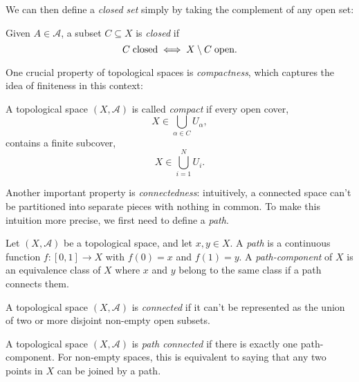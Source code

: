 We can then define a \emph{closed set} simply by taking the complement of any open set:

\begin{definition}
    Given $A \in \mathcal{A}$, a subset $C \subseteq X$ is \emph{closed} if
    \begin{equation}
        C \; \textup{closed} \iff X \setminus C \; \textup{open} .
    \end{equation}
\end{definition}

One crucial property of topological spaces is \emph{compactness}, which captures the idea of finiteness in this context:

\begin{definition}[Compact]
    A topological space $(X,\mathcal{A})$ is called \emph{compact} if every open cover,
    \begin{equation}
        X \in \bigcup_{\alpha \in C} U_\alpha ,
    \end{equation}
    contains a finite subcover,
    \begin{equation}
        X \in \bigcup_{i = 1}^N U_i .
    \end{equation}
\end{definition}

Another important property is \emph{connectedness}: intuitively, a connected space can't be partitioned into separate pieces with nothing in common. To make this intuition more precise, we first need to define a \emph{path}.

\begin{definition}[Path]
    Let $(X, \mathcal{A})$ be a topological space, and let $x,y \in X$. A \emph{path} is a continuous function $f : [0,1] \to X$ with $f(0)=x$ and $f(1)=y$. A \emph{path-component} of $X$ is an equivalence class of $X$ where $x$ and $y$ belong to the same class if a path connects them.
\end{definition}

\begin{definition}[Connected]
    A topological space $(X,\mathcal{A})$ is \emph{connected} if it can't be represented as the union of two or more disjoint non-empty open subsets.
\end{definition}

\begin{definition}
    A topological space $(X,\mathcal{A})$ is \emph{path connected} if there is exactly one path-component. For non-empty spaces, this is equivalent to saying that any two points in $X$ can be joined by a path.
\end{definition}

